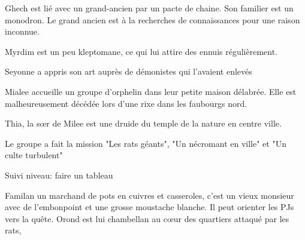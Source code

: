 Ghech est lié avec un grand-ancien par un pacte de chaine. Son familier est un 
monodron. Le grand ancien est à la recherches de connaissances pour une raison
inconnue.

Myrdim est un peu kleptomane, ce qui lui attire des ennuis régulièrement.

Seyonne a appris son art auprès de démonistes qui l'avaient enlevés

Mialee accueille un groupe d'orphelin dans leur petite maison délabrée. Elle
est malheureusement décédée lors d'une rixe dans les faubourgs nord.

Thia, la s\oe{}r de Milee est une druide du temple de la nature en centre ville.

Le groupe a fait la mission "Les rats géants", "Un nécromant en ville" et "Un culte turbulent"

Suivi niveau: faire un tableau

Familan un marchand de pots en cuivres et 
casseroles, c'est un vieux monsieur avec de l'embonpoint et une grosse 
moustache blanche. Il peut orienter les PJs vers la quête.
Orond est lui chambellan au c\oe{}ur des quartiers attaqué par les rats,


